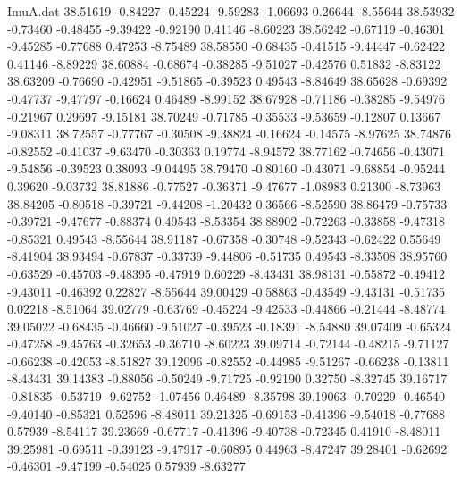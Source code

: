 \begin{filecontents}{ImuA.dat}
  38.51619   -0.84227   -0.45224   -9.59283   -1.06693    0.26644   -8.55644
  38.53932   -0.73460   -0.48455   -9.39422   -0.92190    0.41146   -8.60223
  38.56242   -0.67119   -0.46301   -9.45285   -0.77688    0.47253   -8.75489
  38.58550   -0.68435   -0.41515   -9.44447   -0.62422    0.41146   -8.89229
  38.60884   -0.68674   -0.38285   -9.51027   -0.42576    0.51832   -8.83122
  38.63209   -0.76690   -0.42951   -9.51865   -0.39523    0.49543   -8.84649
  38.65628   -0.69392   -0.47737   -9.47797   -0.16624    0.46489   -8.99152
  38.67928   -0.71186   -0.38285   -9.54976   -0.21967    0.29697   -9.15181
  38.70249   -0.71785   -0.35533   -9.53659   -0.12807    0.13667   -9.08311
  38.72557   -0.77767   -0.30508   -9.38824   -0.16624   -0.14575   -8.97625
  38.74876   -0.82552   -0.41037   -9.63470   -0.30363    0.19774   -8.94572
  38.77162   -0.74656   -0.43071   -9.54856   -0.39523    0.38093   -9.04495
  38.79470   -0.80160   -0.43071   -9.68854   -0.95244    0.39620   -9.03732
  38.81886   -0.77527   -0.36371   -9.47677   -1.08983    0.21300   -8.73963
  38.84205   -0.80518   -0.39721   -9.44208   -1.20432    0.36566   -8.52590
  38.86479   -0.75733   -0.39721   -9.47677   -0.88374    0.49543   -8.53354
  38.88902   -0.72263   -0.33858   -9.47318   -0.85321    0.49543   -8.55644
  38.91187   -0.67358   -0.30748   -9.52343   -0.62422    0.55649   -8.41904
  38.93494   -0.67837   -0.33739   -9.44806   -0.51735    0.49543   -8.33508
  38.95760   -0.63529   -0.45703   -9.48395   -0.47919    0.60229   -8.43431
  38.98131   -0.55872   -0.49412   -9.43011   -0.46392    0.22827   -8.55644
  39.00429   -0.58863   -0.43549   -9.43131   -0.51735    0.02218   -8.51064
  39.02779   -0.63769   -0.45224   -9.42533   -0.44866   -0.21444   -8.48774
  39.05022   -0.68435   -0.46660   -9.51027   -0.39523   -0.18391   -8.54880
  39.07409   -0.65324   -0.47258   -9.45763   -0.32653   -0.36710   -8.60223
  39.09714   -0.72144   -0.48215   -9.71127   -0.66238   -0.42053   -8.51827
  39.12096   -0.82552   -0.44985   -9.51267   -0.66238   -0.13811   -8.43431
  39.14383   -0.88056   -0.50249   -9.71725   -0.92190    0.32750   -8.32745
  39.16717   -0.81835   -0.53719   -9.62752   -1.07456    0.46489   -8.35798
  39.19063   -0.70229   -0.46540   -9.40140   -0.85321    0.52596   -8.48011
  39.21325   -0.69153   -0.41396   -9.54018   -0.77688    0.57939   -8.54117
  39.23669   -0.67717   -0.41396   -9.40738   -0.72345    0.41910   -8.48011
  39.25981   -0.69511   -0.39123   -9.47917   -0.60895    0.44963   -8.47247
  39.28401   -0.62692   -0.46301   -9.47199   -0.54025    0.57939   -8.63277

\end{filecontents}
